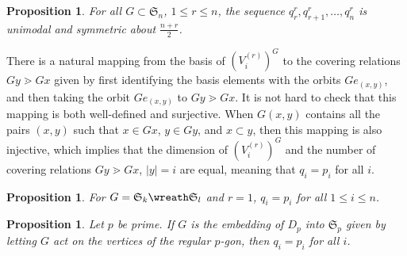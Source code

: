 \documentclass[11pt]{amsart}
\newtheorem{prop}[thm]{Proposition}
\theoremstyle{definition}
\begin{document}
\begin{prop}\label{prop:q_injective_unimodal}
For all $G\subset\mathfrak{S}_n$, $1\le r\le n$, the sequence $q_r^r, q_{r+1}^r,\ldots, q_n^r$ is unimodal and symmetric about $\frac{n+r}{2}$.
\end{prop}




There is a natural mapping from the basis of $\left(V_i^{(r)}\right)^G$ to the covering relations $Gy \gtrdot Gx$ given by first identifying the basis elements with the orbits $Ge_{(x,y)}$, and then taking the orbit $Ge_{(x,y)}$ to $Gy \gtrdot Gx$.  It is not hard to check that this mapping is both well-defined and surjective.  When $G(x,y)$ contains all the pairs $(x,y)$ such that $x\in Gx$, $y\in Gy$, and $x\subset y$, then this mapping is also injective, which implies that the dimension of $\left(V_i^{(r)}\right)^G$ and the number of covering relations $Gy \gtrdot Gx$, $|y| = i$ are equal, meaning that $q_i = p_i$ for all $i$.

\begin{prop}\label{prop:pak_panova_comparison}
For $G = \mathfrak{S}_k \wreath \mathfrak{S}_l$ and $r = 1$, $q_i = p_i$ for all $1\le i\le n$.
\end{prop}

\begin{prop}\label{prop:dihedral_groups}
Let $p$ be prime.  If $G$ is the embedding of $D_p$ into $\mathfrak{S}_p$ given by letting $G$ act on the vertices of the regular $p$-gon, then $q_i = p_i$ for all $i$.
\end{prop}
\end{document}
